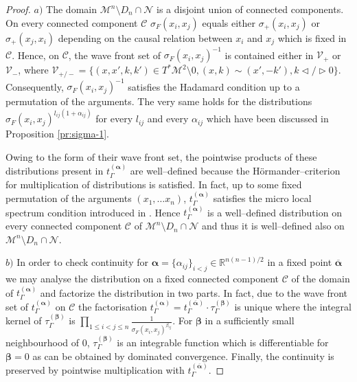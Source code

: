 \documentclass[a4paper,10pt,twoside]{article}
\numberwithin{equation}{section}
\newcounter{and}
\def\M{\mathcal{M}}
\def\N{\mathcal{N}}
\def\balpha{{\boldsymbol{\alpha}}}
\def\bbeta{{\boldsymbol{\beta}}}
\theoremstyle{plain}
\theoremstyle{definition}
\begin{document}
\begin{proof}

$a)$ The domain $\M^n\setminus D_n\cap \N$ is a disjoint union of connected components. On every connected component $\mathcal{C}$ $\sigma_F(x_i,x_j)$ equals either $\sigma_+(x_i,x_j)$ or $\sigma_+(x_j,x_i)$ depending on the causal relation between $x_i$ and $x_j$ which is fixed in $\mathcal{C}$.
Hence, on $\mathcal{C}$, the wave front set of $\sigma_F(x_i,x_j)^{-1}$ is contained either in $\mathcal{V}_+$ or $\mathcal{V}_-$, where $\mathcal{V}_{+/-} = \{(x,x',k,k') \in T^*\M^2\setminus 0, (x,k)\sim (x',-k'),  k \triangleleft / \triangleright 0  \}$. Consequently, $\sigma_F(x_i,x_j)^{-1}$ satisfies the Hadamard condition up to a permutation of the arguments. The very same holds for the distributions $\sigma_F(x_i,x_j)^{l_{ij}(1+\alpha_{ij})}$ for every $l_{ij}$ and every $\alpha_{ij}$ which have been discussed in Proposition \ref{pr:sigma-1}.

Owing to the form of their wave front set, the pointwise products of these distributions present in $t_\Gamma^{(\balpha)}$ are well--defined because the H\"ormander--criterion for multiplication of distributions is satisfied. In fact, up to some fixed permutation of the arguments $(x_1,\dots x_n)$, $t_\Gamma^{(\balpha)}$ satisfies the micro local spectrum condition introduced in \cite{bfk:1996}. 
Hence $t_\Gamma^{(\balpha)}$ is a well--defined distribution on every connected component $\mathcal{C}$ of $\M^n\setminus D_n\cap \N$ and thus it is well--defined also on $\M^n\setminus D_n\cap \N$. 

$b)$ 
In order to check continuity for $\balpha= \{\alpha_{ij}\}_{i<j}\in \mathbb{R}^{n(n-1)/2}$ in a fixed point $\overline{\balpha}$ we may analyse the distribution on a fixed connected component $\mathcal{C}$ of the domain of $t_\Gamma^{(\balpha)}$ and factorize the distribution in two parts. 
In fact, due to the wave front set of $t_\Gamma^{(\balpha)}$ on $\mathcal{C}$ the factorisation $t_\Gamma^{(\balpha)} =t_\Gamma^{(\overline{\balpha})} \cdot \tau_\Gamma^{(\bbeta)}$ is unique where the integral kernel of $\tau_\Gamma^{(\bbeta)}$ is $\prod_{1\leq i < j \leq n } \frac{1}{\sigma_F(x_i,x_j)^{\beta_{ij}}}$.
For $\bbeta$ in a sufficiently small neighbourhood of $0$, $\tau_\Gamma^{(\bbeta)}$ is an integrable function which is differentiable for $\bbeta=0$ as can be obtained by dominated convergence. Finally, the continuity is preserved by pointwise multiplication with $t_\Gamma^{(\overline{\balpha})}$.


\end{proof}
\end{document}
